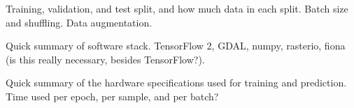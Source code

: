 
Training, validation, and test split, and how much data in each split.
Batch size and shuffling.
Data augmentation.


Quick summary of software stack.
TensorFlow 2, GDAL, numpy, rasterio, fiona (is this really necessary, besides TensorFlow?).


Quick summary of the hardware specifications used for training and prediction.
Time used per epoch, per sample, and per batch?
